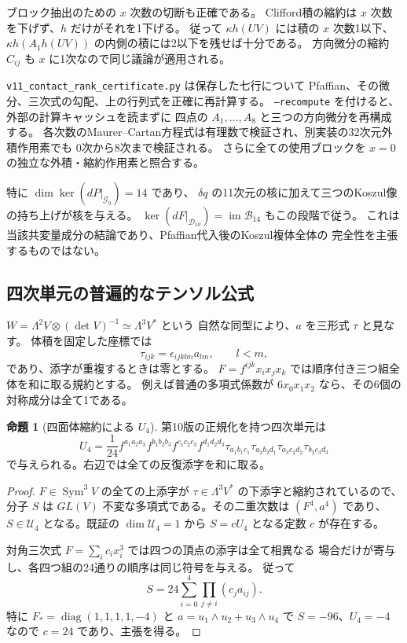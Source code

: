 \documentclass[a4paper,11pt]{ltjsarticle}
\theoremstyle{definition}
\newtheorem{proposition}[theorem]{命題}
\begin{document}
ブロック抽出のための $x$ 次数の切断も正確である。
Clifford積の縮約は $x$ 次数を下げず、$h$ だけがそれを1下げる。
従って $\kappa h(UV)$ には積の $x$ 次数1以下、
$\kappa h(A_1h(UV))$ の内側の積には2以下を残せば十分である。
方向微分の縮約 $C_{ij}$ も $x$ に1次なので同じ議論が適用される。

\texttt{v11\_contact\_rank\_certificate.py} は保存した七行について
Pfaffian、その微分、三次式の勾配、上の行列式を正確に再計算する。
\texttt{--recompute} を付けると、外部の計算キャッシュを読まずに
四点の $A_1,\ldots,A_8$ と三つの方向微分を再構成する。
各次数のMaurer--Cartan方程式は有理数で検証され、別実装の32次元外積作用素でも
0次から8次まで検証される。
さらに全ての使用ブロックを $x=0$ の独立な外積・縮約作用素と照合する。


特に $\dim\ker(dP|_{\mathcal G_9})=14$ であり、
$\delta q$ の11次元の核に加えて三つのKoszul像の持ち上げが核を与える。
$\ker(dF|_{\mathcal D_{10}})=\operatorname{im}\mathcal B_{14}$ もこの段階で従う。
これは当該共変量成分の結論であり、Pfaffian代入後のKoszul複体全体の
完全性を主張するものではない。

\subsection{四次単元の普遍的なテンソル公式}
\label{subsec:v11-tetrahedral-U4}

$W=\Lambda^2V\otimes(\det V)^{-1}\simeq\Lambda^3V^*$ という
自然な同型により、$a$ を三形式 $\tau$ と見なす。
体積を固定した座標では
\[
 \tau_{ijk}=\epsilon_{ijklm}a_{lm},\qquad l<m,
\]
であり、添字が重複するときは零とする。
$F=f^{ijk}x_ix_jx_k$ では順序付き三つ組全体を和に取る規約とする。
例えば普通の多項式係数が $6x_0x_1x_2$ なら、その6個の対称成分は全て1である。

\begin{proposition}[四面体縮約による $U_4$]
\label{prop:v11-tetrahedral-U4}
第10版の正規化を持つ四次単元は
\[
 U_4=\frac1{24}
 f^{a_1a_2a_3}f^{b_1b_2b_3}f^{c_1c_2c_3}f^{d_1d_2d_3}
 \tau_{a_1b_1c_1}\tau_{a_2b_2d_1}
 \tau_{a_3c_2d_2}\tau_{b_3c_3d_3}
\]
で与えられる。右辺では全ての反復添字を和に取る。
\end{proposition}
\begin{proof}
$F\in\operatorname{Sym}^3V$ の全ての上添字が
$\tau\in\Lambda^3V^*$ の下添字と縮約されているので、分子 $S$ は
$GL(V)$ 不変な多項式である。その二重次数は $(F^4,a^4)$ であり、
$S\in\mathcal U_4$ となる。既証の $\dim\mathcal U_4=1$ から
$S=cU_4$ となる定数 $c$ が存在する。

対角三次式 $F=\sum_i c_i x_i^3$ では四つの頂点の添字は全て相異なる
場合だけが寄与し、各四つ組の24通りの順序は同じ符号を与える。
従って
\[
 S=24\sum_{i=0}^4\prod_{j\ne i}(c_j a_{ij}).
\]
特に $F_*=\operatorname{diag}(1,1,1,1,-4)$ と
$a=u_1\wedge u_2+u_3\wedge u_4$ で $S=-96$、$U_4=-4$ なので
$c=24$ であり、主張を得る。
\end{proof}
\end{document}
